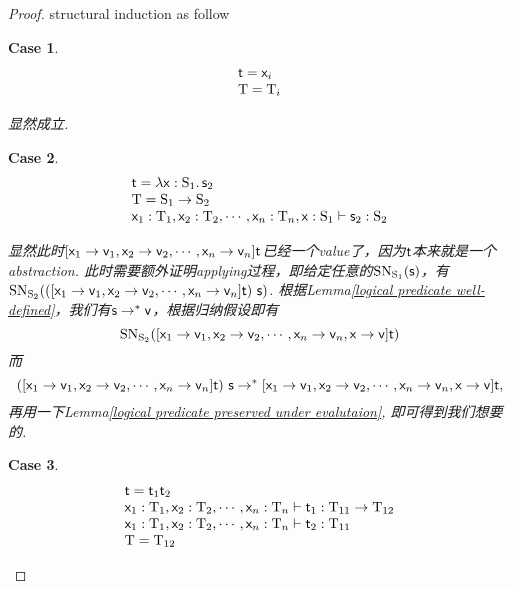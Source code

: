 \documentclass{article}
\theoremstyle{plain}
\newtheorem{case}{Case}
\theoremstyle{nonumberplain}
\newtheorem{proof}{Proof}
\newcommand{\lam}[2]{\ensuremath{\lambda #1\ldotp #2}} %
\newcommand{\singletype}[1]{\text{#1}}
\newcommand{\termtype}[2]{\ensuremath{#1:#2}}
\newcommand{\term}[1]{\ensuremath\mathsf{#1}}
\begin{document}
\begin{proof}
\rm structural induction as follow
\begin{case}
$$
\begin{array}{ll}
\term{t} = \term{x}_i \\
\singletype{T} = \singletype{T}_i
\end{array}
$$ 

显然成立.
\end{case}

\begin{case}
$$
\begin{array}{ll}
\term{t} = \lam{\termtype{\term{x}}{\singletype{S}_1}}{\term{s}_2} \\
\singletype{T}=\singletype{S}_1 \to \singletype{S}_2 \\
\termtype{\term{x}_1}{\singletype{T}_1},\termtype{\term{x}_2}{\singletype{T}_2},\cdots,\termtype{\term{x}_n}{\singletype{T}_n},\termtype{\term{x}}{\singletype{S}_1} \vdash \termtype{\term{s}_2}{\singletype{S}_2}
\end{array}
$$

显然此时$[\term{x}_1 \to \term{v}_1,\term{x}_2 \to \term{v}_2,\cdots,\term{x}_n \to \term{v}_n]\term{t}$已经一个value了，因为$\term{t}$本来就是一个abstraction.	此时需要额外证明applying过程，即给定任意的$\text{SN}_{\singletype{S}_1}(\term{s})$，有$\text{SN}_{\singletype{S}_2}(([\term{x}_1 \to \term{v}_1,\term{x}_2 \to \term{v}_2,\cdots,\term{x}_n \to \term{v}_n]\term{t})~\term{s})$. 根据Lemma\ref{logical predicate well-defined}，我们有$\term{s} \to^* \term{v}$，根据归纳假设即有
$$
\text{SN}_{\singletype{S}_2}([\term{x}_1 \to \term{v}_1,\term{x}_2 \to \term{v}_2,\cdots,\term{x}_n \to \term{v}_n,\term{x} \to \term{v} ]\term{t})
$$
而
$$
([\term{x}_1 \to \term{v}_1,\term{x}_2 \to \term{v}_2,\cdots,\term{x}_n \to \term{v}_n]\term{t})~\term{s} \to^* [\term{x}_1 \to \term{v}_1,\term{x}_2 \to \term{v}_2,\cdots,\term{x}_n \to \term{v}_n,\term{x} \to \term{v} ]\term{t},
$$
再用一下Lemma\ref{logical predicate preserved under evalutaion}, 即可得到我们想要的. 
\end{case}

\begin{case}
$$
\begin{array}{ll}
\term{t} = \term{t}_1\term{t}_2 \\
\termtype{\term{x}_1}{\singletype{T}_1},\termtype{\term{x}_2}{\singletype{T}_2},\cdots,\termtype{\term{x}_n}{\singletype{T}_n} \vdash \termtype{\term{t}_1}{\singletype{T}_{11} \to \singletype{T}_{12}} \\
\termtype{\term{x}_1}{\singletype{T}_1},\termtype{\term{x}_2}{\singletype{T}_2},\cdots,\termtype{\term{x}_n}{\singletype{T}_n} \vdash \termtype{\term{t}_2}{\singletype{T}_{11}} \\
\singletype{T} = \singletype{T}_{12}
\end{array}
$$


\end{case}
\end{proof}
\end{document}
